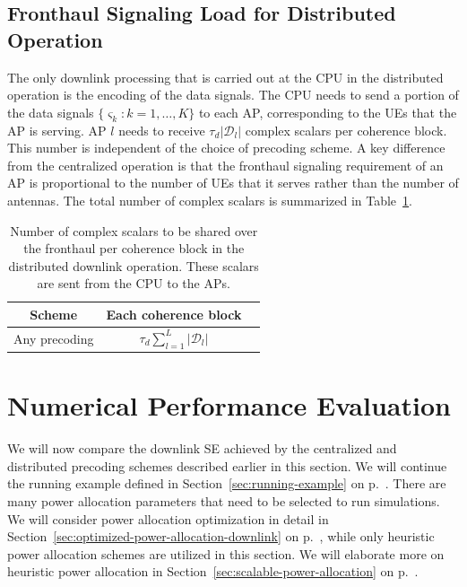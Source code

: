 \subsection{Fronthaul Signaling Load for Distributed Operation}
\label{sec:level2-fronthaul-downlink}

The only downlink processing that is carried out at the CPU in the distributed operation is the encoding of the data signals. The CPU needs to send a portion of the data signals $\{ \varsigma_k : k = 1, \ldots, K\}$ to each AP, corresponding to the UEs that the AP is serving. AP $l$ needs to receive $\tau_d|\mathcal{D}_l|$ complex scalars per coherence block. This number is independent of the choice of precoding scheme. A key difference from the centralized operation is that the fronthaul signaling requirement of an AP is proportional to the number of UEs that it serves rather than the number of antennas.
The total number of complex scalars is summarized in Table~\ref{tab:signaling-level2-downlink}.


\begin{table}[t]  
	\caption{Number of complex scalars to be shared over the fronthaul per coherence block in the distributed downlink operation. These scalars are sent from the CPU to the APs.}  \label{tab:signaling-level2-downlink}
	\centering
	\begin{tabular}{|c|c|c|} 
		\hline
		{Scheme} & {Each coherence block}    \\      \hline\hline 
		Any precoding &  $\tau_d \sum\limits_{l=1}^L |\mathcal{D}_l|$         \\ \hline    
	\end{tabular}
\end{table}







\section{Numerical Performance Evaluation}
\label{sec:downlink-performance-comparison}

We will now compare the downlink SE achieved by the centralized and distributed precoding schemes described earlier in this section. We will continue the running example defined in Section~\ref{sec:running-example} on p.~\pageref{sec:running-example}.
There are many power allocation parameters that need to be selected to run simulations. We will consider power allocation optimization in detail in Section~\ref{sec:optimized-power-allocation-downlink} on p.~\pageref{sec:optimized-power-allocation-downlink}, while only heuristic power allocation schemes are utilized in this section. We will elaborate more on heuristic power allocation in Section~\ref{sec:scalable-power-allocation} on p.~\pageref{sec:scalable-power-allocation}.

